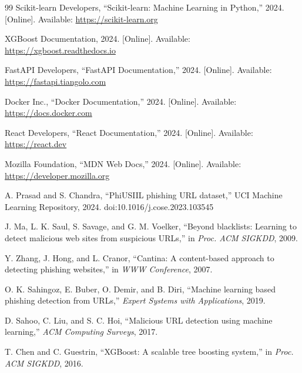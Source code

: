 \begin{thebibliography}{99}
Scikit-learn Developers, “Scikit-learn: Machine Learning in Python,” 2024. [Online]. Available: \url{https://scikit-learn.org}

XGBoost Documentation, 2024. [Online]. Available: \url{https://xgboost.readthedocs.io}

FastAPI Developers, “FastAPI Documentation,” 2024. [Online]. Available: \url{https://fastapi.tiangolo.com}

Docker Inc., “Docker Documentation,” 2024. [Online]. Available: \url{https://docs.docker.com}

React Developers, “React Documentation,” 2024. [Online]. Available: \url{https://react.dev}

Mozilla Foundation, “MDN Web Docs,” 2024. [Online]. Available: \url{https://developer.mozilla.org}


A. Prasad and S. Chandra, “PhiUSIIL phishing URL dataset,” UCI Machine Learning Repository, 2024. doi:10.1016/j.cose.2023.103545

J. Ma, L. K. Saul, S. Savage, and G. M. Voelker, “Beyond blacklists: Learning to detect malicious web sites from suspicious URLs,” in \textit{Proc. ACM SIGKDD}, 2009.

Y. Zhang, J. Hong, and L. Cranor, “Cantina: A content-based approach to detecting phishing websites,” in \textit{WWW Conference}, 2007.

O. K. Sahingoz, E. Buber, O. Demir, and B. Diri, “Machine learning based phishing detection from URLs,” \textit{Expert Systems with Applications}, 2019.

D. Sahoo, C. Liu, and S. C. Hoi, “Malicious URL detection using machine learning,” \textit{ACM Computing Surveys}, 2017.

T. Chen and C. Guestrin, “XGBoost: A scalable tree boosting system,” in \textit{Proc. ACM SIGKDD}, 2016.

\end{thebibliography}
